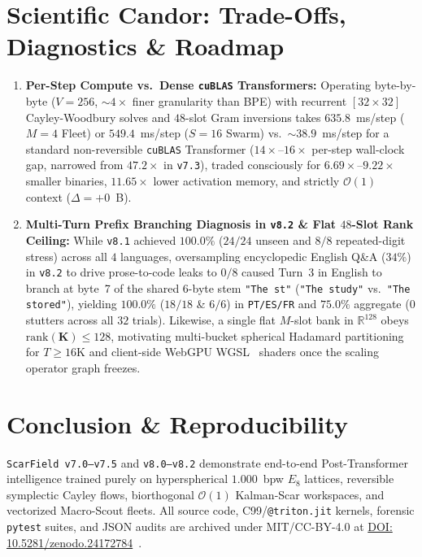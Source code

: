 \documentclass[10pt,twocolumn]{article}
\begin{document}
\section{Scientific Candor: Trade-Offs, Diagnostics \& Roadmap}
\begin{enumerate}
    \item \textbf{Per-Step Compute vs.\ Dense \texttt{cuBLAS} Transformers:} Operating byte-by-byte ($V=256$, $\sim 4\times$ finer granularity than BPE) with recurrent $[32\times 32]$ Cayley-Woodbury solves and $48$-slot Gram inversions takes $635.8$~ms/step ($M=4$ Fleet) or $549.4$~ms/step ($S=16$ Swarm) vs.\ $\sim 38.9$~ms/step for a standard non-reversible \texttt{cuBLAS} Transformer ($14\times$--$16\times$ per-step wall-clock gap, narrowed from $47.2\times$ in \texttt{v7.3}), traded consciously for $6.69\times$--$9.22\times$ smaller binaries, $11.65\times$ lower activation memory, and strictly $\mathcal{O}(1)$ context ($\Delta=+0$~B).
    \item \textbf{Multi-Turn Prefix Branching Diagnosis in \texttt{v8.2} \& Flat $48$-Slot Rank Ceiling:} While \texttt{v8.1} achieved $\mathbf{100.0\%}$ ($24/24$ unseen and $8/8$ repeated-digit stress) across all $4$ languages, oversampling encyclopedic English Q\&A ($34\%$) in \texttt{v8.2} to drive prose-to-code leaks to $0/8$ caused Turn~3 in English to branch at byte~7 of the shared $6$-byte stem \texttt{"The st"} (\texttt{"The study"} vs.\ \texttt{"The stored"}), yielding $100.0\%$ ($18/18$ \& $6/6$) in \texttt{PT/ES/FR} and $75.0\%$ aggregate ($0$ stutters across all $32$ trials). Likewise, a single flat $M$-slot bank in $\mathbb{R}^{128}$ obeys $\mathrm{rank}(\mathbf{K}) \le 128$, motivating multi-bucket spherical Hadamard partitioning for $T \ge 16\text{K}$ and client-side WebGPU WGSL~\citep{w3c2024webgpu} shaders once the scaling operator graph freezes.
\end{enumerate}

\section{Conclusion \& Reproducibility}
\texttt{ScarField v7.0--v7.5} and \texttt{v8.0--v8.2} demonstrate end-to-end Post-Transformer intelligence trained purely on hyperspherical $1.000$~bpw $E_8$ lattices, reversible symplectic Cayley flows, biorthogonal $\mathcal{O}(1)$ Kalman-Scar workspaces, and vectorized Macro-Scout fleets. All source code, C99/\texttt{@triton.jit} kernels, forensic \texttt{pytest} suites, and JSON audits are archived under MIT/CC-BY-4.0 at \href{https://doi.org/10.5281/zenodo.24172784}{DOI: 10.5281/zenodo.24172784}~\citep{reisfilho2026mos_zenodo}.



\end{document}
